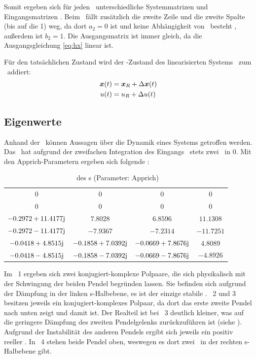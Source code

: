 Somit ergeben sich für jeden \ap\ unterschiedliche Systemmatrizen  und Eingangsmatrizen . Beim \bss\ fällt zusätzlich die zweite Zeile und die zweite Spalte (bis auf die 1) weg, da dort $a_2=0$ ist und keine Abhängigkeit von \xop\ besteht , außerdem ist $b_2=1$.
Die Ausgangsmatrix  ist immer gleich, da die Ausgangsgleichung \eqref{eq:hx} linear ist.

Für den tatsächlichen Zustand wird der \ap-Zustand des linearisierten Systems \dvex\ zum \ap\ addiert:
\begin{subequations} \label{eq:aptransf} \begin{align} 
	\boldsymbol{x}(t)&= \boldsymbol{x}_R + \Delta \boldsymbol{x}(t)	\\
	u(t)&= u_R + \Delta u(t)	
\end{align} \end{subequations} 


\subsection{Eigenwerte}

Anhand der \ewe\ können Aussagen über die Dynamik eines Systems getroffen werden. 
Das \bss\ hat aufgrund der zweifachen Integration des Eingangs \xopp\ stets zwei \ewe\ in 0. 
Mit den Apprich-Parametern ergeben sich folgende \ewe:

\begin{table}[htbp]
	\centering
	\caption{\ewe\ des \bss s (Parameter: Apprich)}
		\begin{tabular}[t]{cccc}
			\toprule
			\ape & \apz & \apd & \apv \\
			\midrule
			$0$	&	$0$	&	$0$	&	$0$	\\
			$0$	&	$0$	&	$0$	&	$0$	\\
			$-0.2972 +11.4177\mathrm{j}$ &    $7.8028						$	&	  $6.8596							$	&   $11.1308$	\\
			$-0.2972 -11.4177\mathrm{j}$ &   $-7.9367						$	&   $-7.2314					$		&  $-11.7251$	\\
			$-0.0418 + 4.8515\mathrm{j}$ &   $-0.1858 + 7.0392\mathrm{j}$	&  $-0.0669 + 7.8676\mathrm{j}$	&  $  4.8089$	\\
			$-0.0418 - 4.8515\mathrm{j}$ &   $-0.1858 - 7.0392\mathrm{j}$	& $ -0.0669 - 7.8676\mathrm{j}	$	&  $ -4.8926$	\\
			\bottomrule
		\end{tabular}
	\label{tab:ewappr}
\end{table}
Im \ap\ 1 ergeben sich zwei konjugiert-komplexe Polpaare, die sich physikalisch mit der Schwingung der beiden Pendel begründen lassen. Sie befinden sich aufgrund der Dämpfung in der linken s-Halbebene, es ist der einzige stabile \ap. \ap\ 2 und 3 besitzen jeweils ein konjugiert-komplexes Polpaar, da dort das erste \bzw zweite Pendel nach unten zeigt und damit  ist. Der Realteil ist bei \ap\ 3 deutlich kleiner, was auf die geringere Dämpfung des zweiten Pendelgelenks zurückzuführen ist (siehe ). Aufgrund der Instabilität des anderen Pendels ergibt sich jeweils ein positiv reeller \ew. In \ap\ 4 stehen beide Pendel oben, weswegen es dort zwei \ewe\ in der rechten s-Halbebene gibt.

